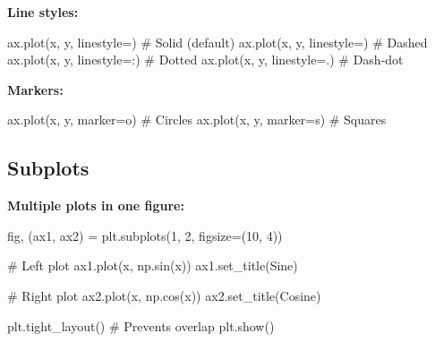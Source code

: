 \documentclass[
  letterpaper,
  DIV=11,
  numbers=noendperiod]{scrartcl}
\newenvironment{Shaded}{\begin{snugshade}}{\end{snugshade}}
\newcommand{\CommentTok}[1]{\textcolor[rgb]{0.37,0.37,0.37}{#1}}
\newcommand{\DecValTok}[1]{\textcolor[rgb]{0.68,0.00,0.00}{#1}}
\newcommand{\NormalTok}[1]{\textcolor[rgb]{0.00,0.23,0.31}{#1}}
\newcommand{\OperatorTok}[1]{\textcolor[rgb]{0.37,0.37,0.37}{#1}}
\newcommand{\StringTok}[1]{\textcolor[rgb]{0.13,0.47,0.30}{#1}}
\begin{document}
\textbf{Line styles:}

\begin{Shaded}
\begin{Highlighting}[]
\NormalTok{ax.plot(x, y, linestyle}\OperatorTok{=}\StringTok{\textquotesingle{}{-}\textquotesingle{}}\NormalTok{)   }\CommentTok{\# Solid (default)}
\NormalTok{ax.plot(x, y, linestyle}\OperatorTok{=}\StringTok{\textquotesingle{}{-}{-}\textquotesingle{}}\NormalTok{)  }\CommentTok{\# Dashed}
\NormalTok{ax.plot(x, y, linestyle}\OperatorTok{=}\StringTok{\textquotesingle{}:\textquotesingle{}}\NormalTok{)   }\CommentTok{\# Dotted}
\NormalTok{ax.plot(x, y, linestyle}\OperatorTok{=}\StringTok{\textquotesingle{}{-}.\textquotesingle{}}\NormalTok{)  }\CommentTok{\# Dash{-}dot}
\end{Highlighting}
\end{Shaded}

\textbf{Markers:}

\begin{Shaded}
\begin{Highlighting}[]
\NormalTok{ax.plot(x, y, marker}\OperatorTok{=}\StringTok{\textquotesingle{}o\textquotesingle{}}\NormalTok{)  }\CommentTok{\# Circles}
\NormalTok{ax.plot(x, y, marker}\OperatorTok{=}\StringTok{\textquotesingle{}s\textquotesingle{}}\NormalTok{)  }\CommentTok{\# Squares}
\end{Highlighting}
\end{Shaded}

\subsection{Subplots}\label{subplots}

\textbf{Multiple plots in one figure:}

\begin{Shaded}
\begin{Highlighting}[]
\NormalTok{fig, (ax1, ax2) }\OperatorTok{=}\NormalTok{ plt.subplots(}\DecValTok{1}\NormalTok{, }\DecValTok{2}\NormalTok{, figsize}\OperatorTok{=}\NormalTok{(}\DecValTok{10}\NormalTok{, }\DecValTok{4}\NormalTok{))}

\CommentTok{\# Left plot}
\NormalTok{ax1.plot(x, np.sin(x))}
\NormalTok{ax1.set\_title(}\StringTok{\textquotesingle{}Sine\textquotesingle{}}\NormalTok{)}

\CommentTok{\# Right plot}
\NormalTok{ax2.plot(x, np.cos(x))}
\NormalTok{ax2.set\_title(}\StringTok{\textquotesingle{}Cosine\textquotesingle{}}\NormalTok{)}

\NormalTok{plt.tight\_layout()  }\CommentTok{\# Prevents overlap}
\NormalTok{plt.show()}
\end{Highlighting}
\end{Shaded}
\end{document}
